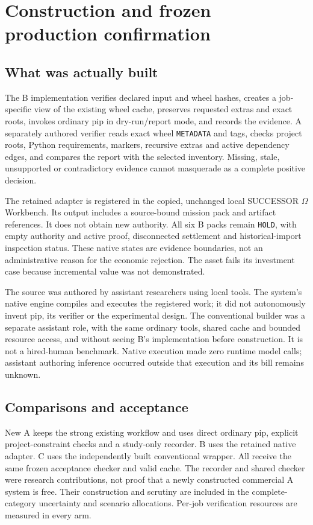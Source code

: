 \documentclass[11pt,letterpaper]{article}
\begin{document}
\section{Construction and frozen production confirmation}

\subsection{What was actually built}

The B implementation verifies declared input and wheel hashes, creates a job-specific view of the existing wheel cache, preserves requested extras and exact roots, invokes ordinary pip in dry-run/report mode, and records the evidence. A separately authored verifier reads exact wheel \texttt{METADATA} and tags, checks project roots, Python requirements, markers, recursive extras and active dependency edges, and compares the report with the selected inventory. Missing, stale, unsupported or contradictory evidence cannot masquerade as a complete positive decision.

The retained adapter is registered in the copied, unchanged local SUCCESSOR $\Omega$ Workbench. Its output includes a source-bound mission pack and artifact references. It does not obtain new authority. All six B packs remain \texttt{HOLD}, with empty authority and active proof, disconnected settlement and historical-import inspection status. These native states are evidence boundaries, not an administrative reason for the economic rejection. The asset fails its investment case because incremental value was not demonstrated.

The source was authored by assistant researchers using local tools. The system's native engine compiles and executes the registered work; it did not autonomously invent pip, its verifier or the experimental design. The conventional builder was a separate assistant role, with the same ordinary tools, shared cache and bounded resource access, and without seeing B's implementation before construction. It is not a hired-human benchmark. Native execution made zero runtime model calls; assistant authoring inference occurred outside that execution and its bill remains unknown.

\subsection{Comparisons and acceptance}

New A keeps the strong existing workflow and uses direct ordinary pip, explicit project-constraint checks and a study-only recorder. B uses the retained native adapter. C uses the independently built conventional wrapper. All receive the same frozen acceptance checker and valid cache. The recorder and shared checker were research contributions, not proof that a newly constructed commercial A system is free. Their construction and scrutiny are included in the complete-category uncertainty and scenario allocations. Per-job verification resources are measured in every arm.
\end{document}
